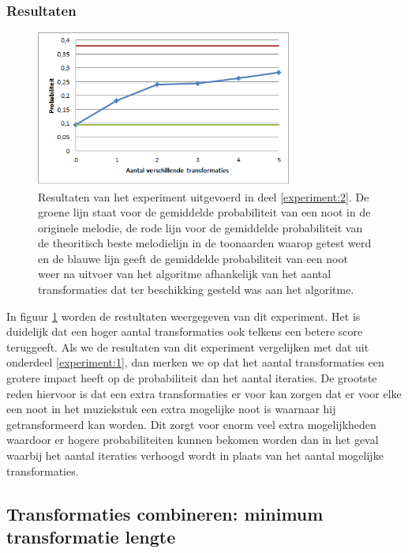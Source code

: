 \subsubsection{Resultaten}
\begin{figure}[!ht]
  \centering
  \includegraphics[width=0.75\textwidth]{5_Experimenten_Resultaten/exp2_res}
  \caption{Resultaten van het experiment uitgevoerd in deel \ref{experiment:2}. De groene lijn staat voor de gemiddelde probabiliteit van een noot in de originele melodie, de rode lijn voor de gemiddelde probabiliteit van de theoritisch beste melodielijn in de toonaarden waarop getest werd en de blauwe lijn geeft de gemiddelde probabiliteit van een noot weer na uitvoer van het algoritme afhankelijk van het aantal transformaties dat ter beschikking gesteld was aan het algoritme.}
  \label{figuur:exp2}
\end{figure}

In figuur \ref{figuur:exp2} worden de restultaten weergegeven van dit experiment. Het is duidelijk dat een  hoger aantal transformaties ook telkens een betere score teruggeeft. Als we de resultaten van dit experiment vergelijken met dat uit onderdeel \ref{experiment:1}, dan merken we op dat het aantal transformaties een grotere impact heeft op de probabiliteit dan het aantal iteraties. De grootste reden hiervoor is dat een extra transformaties er voor kan zorgen dat er voor elke een noot in het muziekstuk een extra mogelijke noot is waarnaar hij getransformeerd kan worden. Dit zorgt voor enorm veel extra mogelijkheden waardoor er hogere probabiliteiten kunnen bekomen worden dan in het geval waarbij het aantal iteraties verhoogd wordt in plaats van het aantal mogelijke transformaties.  


\subsection{Transformaties combineren: minimum transformatie lengte}
\label{experiment:3}
